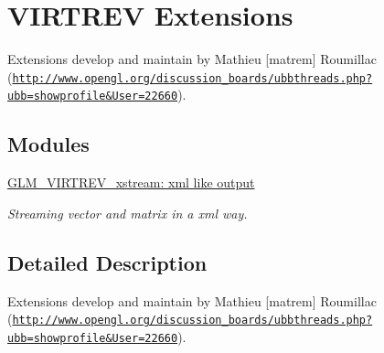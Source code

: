\hypertarget{group__virtrev}{\section{\-V\-I\-R\-T\-R\-E\-V \-Extensions}
\label{group__virtrev}
}


\-Extensions develop and maintain by \-Mathieu \mbox{[}matrem\mbox{]} \-Roumillac (\href{http://www.opengl.org/discussion_boards/ubbthreads.php?ubb=showprofile&User=22660}{\tt http\-://www.\-opengl.\-org/discussion\-\_\-boards/ubbthreads.\-php?ubb=showprofile\&\-User=22660}).  


\subsection*{\-Modules}
\begin{DoxyCompactItemize}
\item 
\hyperlink{group__virtrev__xstream}{\-G\-L\-M\-\_\-\-V\-I\-R\-T\-R\-E\-V\-\_\-xstream\-: xml like output}
\begin{DoxyCompactList}\small\item\em \-Streaming vector and matrix in a xml way. \end{DoxyCompactList}\end{DoxyCompactItemize}


\subsection{\-Detailed \-Description}
\-Extensions develop and maintain by \-Mathieu \mbox{[}matrem\mbox{]} \-Roumillac (\href{http://www.opengl.org/discussion_boards/ubbthreads.php?ubb=showprofile&User=22660}{\tt http\-://www.\-opengl.\-org/discussion\-\_\-boards/ubbthreads.\-php?ubb=showprofile\&\-User=22660}). 